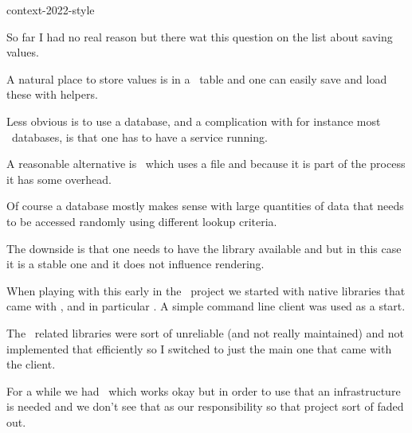 
\environment context-2022-style

\startdocument
  [title={SQL in Metapost},
   banner={combining technologies},
   location={context\enspace {\bf 2022}\enspace meeting}]

\starttitle[title=The reason]

\startitemize

\startitem
    So far I had no real reason but there wat this question on the list about
    saving values.
\stopitem

\startitem
    A natural place to store values is in a \LUA\ table and one can easily save
    and load these with helpers.
\stopitem

\startitem
    Less obvious is to use a database, and a complication with for instance most
    \SQL\ databases, is that one has to have a service running.
\stopitem

\startitem
    A reasonable alternative is \SQLITE\ which uses a file and because it is part
    of the process it has some overhead.
\stopitem

\startitem
    Of course a database mostly makes sense with large quantities of data that
    needs to be accessed randomly using different lookup criteria.
\stopitem

\startitem
    The downside is that one needs to have the library available and but in this
    case it is a stable one and it does not influence rendering.
\stopitem

\stopitemize

\stoptitle

\starttitle[title=Libraries]

\startitemize

    \startitem
        When playing with this early in the \LUATEX\ project we started with
        native libraries that came with \LUA, and in particular \MYSQL. A simple
        command line client was used as a start.
    \stopitem

    \startitem
        The \LUA\ related libraries were sort of unreliable (and not really
        maintained) and not implemented that efficiently so I switched to just
        the main one that came with the client.
    \stopitem

    \startitem
        For a while we had \SWIGLIB\ which works okay but in order to use that an
        infrastructure is needed and we don't see that as our responsibility so
        that project sort of faded out.
    \stopitem

